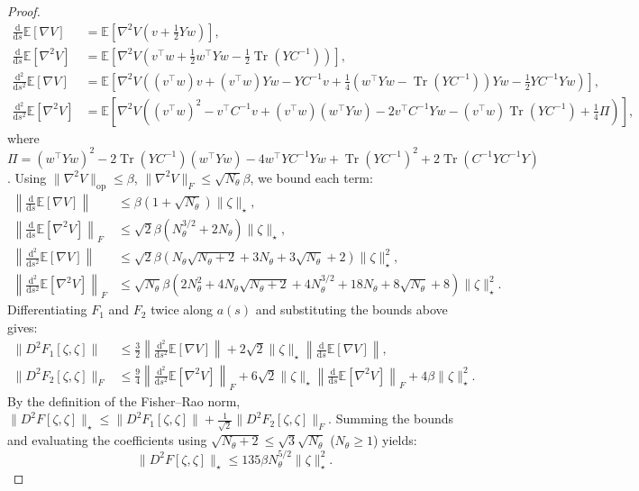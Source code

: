 \documentclass[11pt]{article}
\theoremstyle{plain}
\theoremstyle{definition}
\theoremstyle{remark}
\newcommand{\E}{\mathbb{E}}
\newcommand{\Tr}{\operatorname{Tr}}
\newcommand{\op}{\mathrm{op}}
\newcommand{\dd}{\mathrm{d}}
\begin{document}
\begin{proof}
    \begin{align*}
        \frac{\dd}{\dd s} \E[\nabla V] &= \E\left[ \nabla^2 V \left( v + \frac{1}{2} Yw \right) \right], \\
        \frac{\dd}{\dd s} \E[\nabla^2 V] &= \E\left[ \nabla^2V \left( v^\top w + \frac{1}{2} w^\top Y w - \frac{1}{2} \Tr (YC^{-1}) \right) \right],\\
        \frac{\dd^2}{\dd s^2} \E[\nabla V] &= \E\left[ \nabla^2 V \left( (v^\top w) v + (v^\top w) Yw - YC^{-1} v + \frac{1}{4} (w^\top Yw - \Tr (YC^{-1})) Yw - \frac{1}{2} YC^{-1} Yw \right) \right], \\
        \frac{\dd^2}{\dd s^2} \E[\nabla^2 V] &= \E\left[\nabla^2 V \left((v^\top w)^2 - v^\top C^{-1} v + (v^\top w)(w^\top Yw) - 2v^\top C^{-1}Yw - (v^\top w)\Tr(YC^{-1}) + \frac{1}{4}\Pi \right)\right],
    \end{align*}
    where $\Pi = (w^\top Yw)^2 - 2\Tr(YC^{-1})(w^\top Yw) - 4 w^\top YC^{-1}Yw + \Tr(YC^{-1})^2 + 2\Tr(C^{-1}YC^{-1}Y)$.
    Using $\|\nabla^2 V\|_\op \le \beta$, $\|\nabla^2 V\|_F \le \sqrt{N_\theta} \beta$, we bound each term:
    \begin{align*}
        \left\| \frac{\dd}{\dd s} \E[\nabla V] \right\| &\le \beta (1 + \sqrt{N_\theta}) \|\zeta\|_\star, \\
        \left\| \frac{\dd}{\dd s} \E[\nabla^2 V] \right\|_F &\le \sqrt{2}\beta (N_\theta^{3/2} + 2N_\theta) \|\zeta\|_\star, \\
        \left\| \frac{\dd^2}{\dd s^2} \E[\nabla V] \right\| &\le \sqrt{2}\beta \left(N_\theta \sqrt{N_\theta + 2} + 3N_\theta + 3\sqrt{N_\theta} + 2\right) \|\zeta\|_\star^2, \\
        \left\| \frac{\dd^2}{\dd s^2} \E[\nabla^2 V] \right\|_F &\le \sqrt{N_\theta} \beta \left(2N_\theta^2 + 4N_\theta \sqrt{N_\theta + 2} + 4N_\theta^{3/2} + 18N_\theta + 8\sqrt{N_\theta} + 8\right) \|\zeta\|_\star^2.
    \end{align*}
    Differentiating $F_1$ and $F_2$ twice along $a(s)$ and substituting the bounds above gives:
    \begin{align*}
        \| D^2 F_1 [\zeta, \zeta] \| &\le \frac{3}{2} \left\| \frac{\dd^2}{\dd s^2} \E[\nabla V] \right\| + 2\sqrt{2} \|\zeta\|_\star \left\| \frac{\dd}{\dd s} \E[\nabla V] \right\|, \\
        \| D^2 F_2 [\zeta, \zeta] \|_F &\le \frac{9}{4} \left\| \frac{\dd^2}{\dd s^2} \E[\nabla^2 V] \right\|_F + 6\sqrt{2} \|\zeta\|_\star \left\| \frac{\dd}{\dd s} \E[\nabla^2 V] \right\|_F + 4\beta \|\zeta\|_\star^2.
    \end{align*}
    By the definition of the Fisher--Rao norm, $\|D^2 F [\zeta, \zeta]\|_\star \le \|D^2 F_1 [\zeta, \zeta]\| + \frac{1}{\sqrt{2}} \|D^2 F_2 [\zeta, \zeta]\|_F$. Summing the bounds and evaluating the coefficients using $\sqrt{N_\theta + 2} \le \sqrt{3}\sqrt{N_\theta}$ ($N_\theta \geq 1$) yields:
    \begin{equation*}
        \|D^2 F [\zeta, \zeta]\|_\star \le 135 \beta N_\theta^{5/2} \|\zeta\|_\star^2.
    \end{equation*}
\end{proof}
\end{document}
